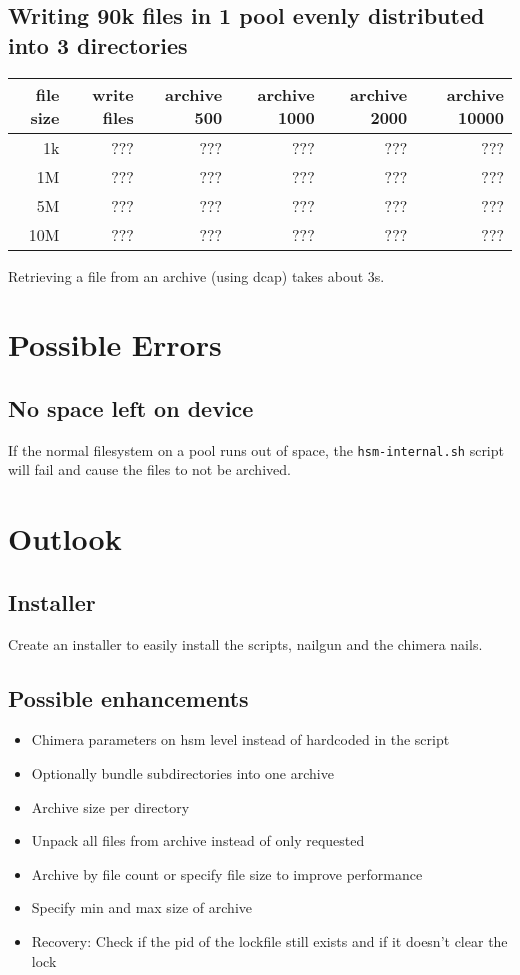 \documentclass[a4paper,8pt]{scrartcl}
\begin{document}
\subsection{Writing 90k files in 1 pool evenly distributed into 3 directories}
\begin{tabular}{|r|r|r|r|r|r|}
  \hline
  file size & write files  & archive 500 & archive 1000 & archive 2000 & archive 10000 \\
  \hline
  1k        & ??? & ??? & ??? & ??? & ??? \\
  \hline
  1M        & ??? & ??? & ??? & ??? & ??? \\
  \hline
  5M        & ??? & ??? & ??? & ??? & ??? \\
  \hline
  10M       & ??? & ??? & ??? & ??? & ??? \\
  \hline
\end{tabular}


Retrieving a file from an archive (using dcap) takes about 3s.

\section{Possible Errors}

\subsection{No space left on device}
If the normal filesystem on a pool runs out of space, the
\texttt{hsm-internal.sh} script will fail and cause the files to not be
archived.

\section{Outlook}

\subsection{Installer}
Create an installer to easily install the scripts, nailgun and the chimera nails.

\subsection{Possible enhancements}
\begin{itemize}
  \item Chimera parameters on hsm level instead of hardcoded in the script
  \item Optionally bundle subdirectories into one archive
  \item Archive size per directory
  \item Unpack all files from archive instead of only requested
  \item Archive by file count or specify file size to improve performance
  \item Specify min and max size of archive
  \item Recovery: Check if the pid of the lockfile still exists and if it doesn't clear the lock
\end{itemize}
\end{document}
